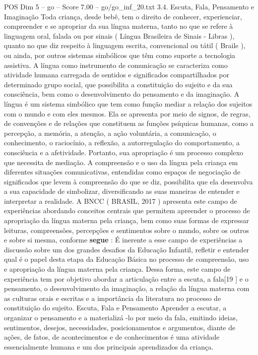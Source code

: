\begin{textsample}{POS Dim 5 – go – Score 7.00 – go/go\_inf\_20.txt}  \label{ex:f5_pos_010}
3.4.
Escuta, Fala, Pensamento e Imaginação Toda criança, desde bebê, tem o direito de conhecer, experienciar, compreender e se apropriar da sua língua materna, tanto no que se refere à linguagem oral, falada ou por sinais ( Língua Brasileira de Sinais - Libras ), quanto no que diz respeito à linguagem escrita, convencional ou tátil ( Braile ), ou ainda, por outros sistemas simbólicos que têm como suporte a tecnologia assistiva.
A língua como instrumento de comunicação se caracteriza como atividade humana carregada de sentidos e significados compartilhados por determinado grupo social, que possibilita a constituição do sujeito e da sua consciência, bem como o desenvolvimento do pensamento e da imaginação.
A língua é um sistema simbólico que tem como função mediar a relação dos sujeitos com o mundo e com eles mesmos.
Ela se apresenta por meio de signos, de regras, de convenções e de relações que constituem as funções psíquicas humanas, como a percepção, a memória, a atenção, a ação voluntária, a comunicação, o conhecimento, o raciocínio, a reflexão, a autorregulação do comportamento, a consciência e a afetividade.
Portanto, sua apropriação é um processo complexo que necessita de mediação.
A compreensão e o uso da língua pela criança em diferentes situações comunicativas, entendidas como espaços de negociação de significados que levem à compreensão do que se diz, possibilita que ela desenvolva a sua capacidade de simbolizar, diversificando as suas maneiras de entender e interpretar a realidade.
A BNCC ( BRASIL, 2017 ) apresenta este campo de experiências abordando conceitos centrais que permitem apreender o processo de apropriação da língua materna pela criança, bem como suas formas de expressar leituras, compreensões, percepções e sentimentos sobre o mundo, sobre os outros e sobre si mesma, conforme \textbf{segue} : É inerente a esse campo de experiências a discussão sobre um dos grandes desafios da Educação Infantil, refletir e entender qual é o papel desta etapa da Educação Básica no processo de compreensão, uso e apropriação da língua materna pela criança.
Dessa forma, este campo de experiência tem por objetivo abordar a articulação entre a escuta, a fala[19 ] e o pensamento, o desenvolvimento da imaginação, a relação da língua materna com as culturas orais e escritas e a importância da literatura no processo de constituição do sujeito.
Escuta, Fala e Pensamento Aprender a escutar, a organizar o pensamento e a materializá -lo por meio da fala, emitindo ideias, sentimentos, desejos, necessidades, posicionamentos e argumentos, diante de ações, de fatos, de acontecimentos e de conhecimentos é uma atividade essencialmente humana e um dos principais aprendizados da criança.

\end{textsample}
